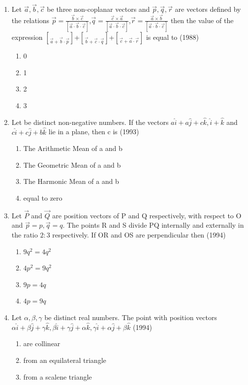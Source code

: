 \documentclass[12pt]{article}
\providecommand{\sbrak}[1]{\ensuremath{{}\left[#1\right]}}
\begin{document}
\begin{enumerate}
\item Let $\vec{a},\vec{b},\vec{c}$ be three non-coplanar vectors and $\vec{p},\vec{q},\vec{r}$ are vectors defined by the relations $\vec{p}=\frac{\vec{b}\times\vec{c}}{\sbrak{\vec{a}\cdot\vec{b}\cdot\vec{c}}}$,$\vec{q}=\frac{\vec{c}\times\vec{a}}{\sbrak{\vec{a}\cdot\vec{b}\cdot\vec{c}}}$,$\vec{r}=\frac{\vec{a}\times\vec{b}}{\sbrak{\vec{a}\cdot\vec{b}\cdot\vec{c}}}$ then the value of the expression $\brack{\vec{a}+\vec{b}}\cdot\vec{p}$+$\brack{\vec{b}+\vec{c}}\cdot\vec{q}$+$\brack{\vec{c}+\vec{a}}\cdot\vec{r}$ is equal to    (1988)
\begin{enumerate}
\item 0
\item 1
\item 2
\item 3
\end{enumerate}
\item Let be distinct non-negative numbers. If the vectors $a\hat{i}+a\hat{j}+c\hat{k},\hat{i}+\hat{k}$ and $c\hat{i}+c\hat{j}+b\hat{k}$ lie in a plane, then c is  (1993)
\begin{enumerate}
\item The Arithmetic Mean of a and b
\item The Geometric Mean of a and b
\item The Harmonic Mean of a and b
\item equal to zero
\end{enumerate}
\item Let $\vec{P}$ and $\vec{Q}$ are position vectors of P and Q respectively, with respect to O and $\vec{p}=p,\vec{q}=q$. The points R and S divide PQ internally and externally in the ratio $2:3$ respectively. If OR and OS are perpendicular then (1994)
\begin{enumerate}
\item $9q^2=4q^2$
\item $4p^2=9q^2$ 
\item $9p=4q$
\item $4p=9q$
\end{enumerate}
\item Let $\alpha,\beta,\gamma $ be distinct real numbers. The point with position vectors $\alpha\hat{i}+\beta\hat{j}+\gamma\hat{k},\beta\hat{i}+\gamma\hat{j}+\alpha\hat{k},\gamma\hat{i}+\alpha\hat{j}+\beta\hat{k}$      (1994)
\begin{enumerate}
\item are collinear 
\item from an equilateral triangle
\item from a scalene triangle

\end{enumerate}
\end{enumerate}
\end{document}
